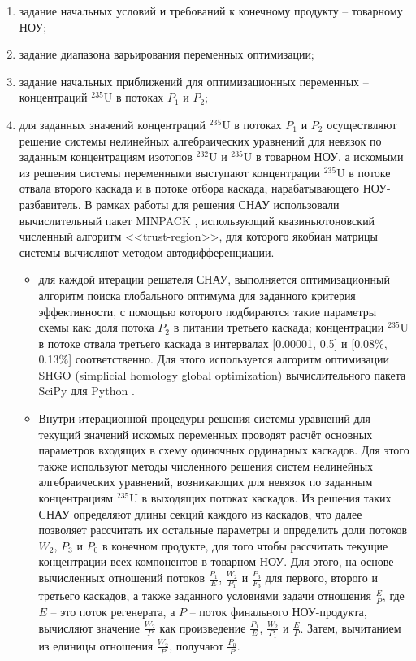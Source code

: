 \begin{enumerate}
    \item задание начальных условий и требований к конечному продукту -- товарному НОУ;
    \item задание диапазона варьирования переменных оптимизации;    
    \item задание начальных приближений для оптимизационных переменных -- концентраций $^{235}$U в потоках $P_1$ и $P_2$;
    \item для заданных значений концентраций $^{235}$U в потоках $P_1$ и $P_2$ осуществляют решение системы нелинейных алгебраических уравнений для невязок по заданным концентрациям изотопов $^{232}$U и $^{235}$U в товарном НОУ, а искомыми из решения системы переменными выступают концентрации $^{235}$U в потоке отвала второго каскада и в потоке отбора каскада, нарабатывающего НОУ-разбавитель. В рамках работы для решения СНАУ использовали вычислительный пакет MINPACK \cite{moreMINPACK}, использующий квазиньютоновский численный алгоритм <<trust-region>>, для которого якобиан матрицы системы вычисляют методом автодифференциации.
        \begin{itemize}
        \item для каждой итерации решателя СНАУ, выполняется оптимизационный алгоритм поиска глобального оптимума для заданного критерия эффективности, с помощью которого подбираются такие параметры схемы как: доля потока $P_2$ в питании третьего каскада; концентрации $^{235}$U в потоке отвала третьего каскада в интервалах [0.00001, 0.5] и [0.08\%, 0.13\%] соответственно. Для этого используется алгоритм оптимизации SHGO (simplicial homology global optimization) вычислительного пакета SciPy для Python  \cite{virtanenSciPyFundamentalAlgorithms2020}.        
        \item Внутри итерационной процедуры решения системы уравнений для текущий значений искомых переменных проводят расчёт основных параметров входящих в схему одиночных ординарных каскадов. Для этого также используют методы численного решения систем нелинейных алгебраических уравнений, возникающих для невязок по заданным концентрациям $^{235}$U в выходящих потоках каскадов. Из решения таких СНАУ определяют длины секций каждого из каскадов, что далее позволяет рассчитать их остальные параметры и определить доли потоков $W_2$, $P_3$  и $P_0$ в конечном продукте, для того чтобы рассчитать текущие концентрации всех компонентов в товарном НОУ. Для этого, на основе вычисленных отношений потоков $\frac{P_{1}}{E}$, $\frac{W_{2}}{P_{1}}$ и $\frac{P_{3}}{F_{3}}$ для первого, второго и третьего каскадов, а также заданного условиями задачи отношения $\frac{E}{P}$, где $E$ -- это поток регенерата, а $P$ -- поток финального НОУ-продукта, вычисляют значение $\frac{W_{2}}{P}$ как произведение $\frac{P_{1}}{E}$, $\frac{W_{2}}{P_{1}}$ и $\frac{E}{P}$. Затем, вычитанием из единицы отношения $\frac{W_{2}}{P}$, получают $\frac{P_{0}}{P}$.
        

\end{itemize}
\end{enumerate}
